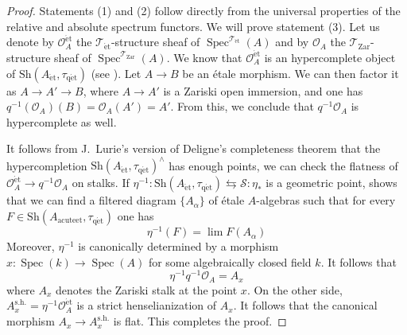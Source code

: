 \documentclass[12pt,a4paper,reqno]{amsart}
\theoremstyle{plain}
\theoremstyle{definition}
\theoremstyle{remark}
\numberwithin{equation}{section}
\begin{document}
\begin{proof}
	Statements (1) and (2) follow directly from the universal properties of the relative and absolute spectrum functors.
	We will prove statement (3).
	Let us denote by ${\mathcal O}_A^{\mathrm{\acute{e}t}}$ the ${{\mathcal T}_{\mathrm{\acute{e}t}}}$-structure sheaf of $\operatorname{Spec}^{{\mathcal T}_{\mathrm{\acute{e}t}}}(A)$ and by ${\mathcal O}_A$ the ${{\mathcal T}_{\mathrm{Zar}}}$-structure sheaf of $\operatorname{Spec}^{{\mathcal T}_{\mathrm{Zar}}}(A)$.
	We know that ${\mathcal O}_A^{\mathrm{\acute{e}t}}$ is an hypercomplete object of ${\mathrm{Sh}}(A_{\mathrm{\acute{e}t}}, {\tau_\mathrm{q\acute{e}t}})$ (see \cite[Theorem 8.4.2.(3)]{DAG-VII}).
	Let $A \to B$ be an \'etale morphism. We can then factor it as $A \to A' \to B$, where $A \to A'$ is a Zariski open immersion, and one has $q{^{-1}}({\mathcal O}_A)(B) = {\mathcal O}_A(A') = A'$.
	From this, we conclude that $q{^{-1}} {\mathcal O}_A$ is hypercomplete as well.
	
	It follows from J.\ Lurie's version of Deligne's completeness theorem \cite[Theorem 4.1]{DAG-VII} that the hypercompletion ${\mathrm{Sh}}(A_{\mathrm{\acute{e}t}}, {\tau_\mathrm{q\acute{e}t}})^\wedge$ has enough points, we can check the flatness of ${\mathcal O}_A^{\mathrm{\acute{e}t}} \to q{^{-1}} {\mathcal O}_A$ on stalks.
	If $\eta{^{-1}} \colon {\mathrm{Sh}}(A_{\mathrm{\acute{e}t}}, {\tau_\mathrm{q\acute{e}t}}) \leftrightarrows {\mathcal S} \colon \eta_*$ is a geometric point, \cite[Proposition 1.1.6]{DAG-VIII} shows that we can find a filtered diagram $\{A_\alpha\}$ of \'etale $A$-algebras such that for every $F \in {\mathrm{Sh}}(A_{\mathrm{acute{e}t}}, {\tau_\mathrm{q\acute{e}t}})$ one has
	\[ \eta{^{-1}}(F) = \lim F(A_\alpha)  \]
	Moreover, $\eta{^{-1}}$ is canonically determined by a morphism $x \colon \operatorname{Spec}(k) \to \operatorname{Spec}(A)$ for some algebraically closed field $k$.
	It follows that
	\[ \eta{^{-1}} q{^{-1}} {\mathcal O}_A = A_x \]
	where $A_x$ denotes the Zariski stalk at the point $x$.
	On the other side, $A_x^{\mathrm{s.h.}} = \eta{^{-1}} {\mathcal O}_A^{\mathrm{\acute{e}t}}$ is a strict henselianization of $A_x$.
	It follows that the canonical morphism $A_x \to A_x^{\mathrm{s.h.}}$ is flat.
	{\ignorespaces}
	This completes the proof.
\end{proof}
\end{document}
